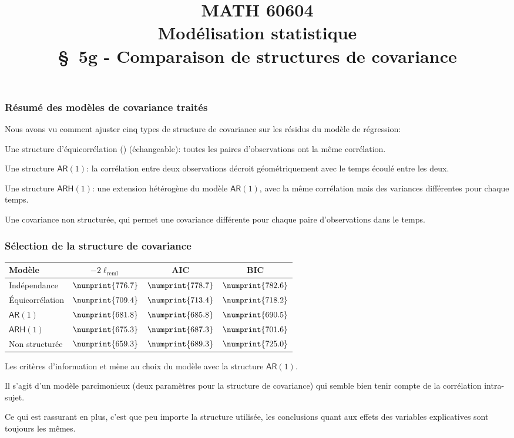 \documentclass{beamer}
\title[\color{white}{MATH 60604 \S~5g - Comparaison de structures de covariance}]{\texorpdfstring{MATH 60604 \\Modélisation statistique \\ \S~5g - Comparaison de structures de covariance}{MATH 60604 \\Modélisation statistique \\ \S~5g - Comparaison de structures de covariance}}
\author{}
\institute{HEC Montréal\\
Département de sciences de la décision}
\date{}
\begin{document}
\frame{\titlepage}

\begin{frame}[fragile]
\frametitle{Résumé des modèles de covariance traités}
\bi
\item Nous avons vu comment ajuster cinq types de structure de covariance sur les résidus du modèle de régression:
\bi

\item Une structure d'équicorrélation () (échangeable): toutes les paires d'observations ont la même corrélation.
\item Une structure \alert{$\mathsf{AR}(1)$}: la corrélation entre deux observations décroit géométriquement avec le temps écoulé entre les deux. 
\item Une structure \alert{$\mathsf{ARH}(1)$}: une extension hétérogène du modèle $\mathsf{AR}(1)$, avec la même corrélation mais des variances différentes pour chaque temps.
\item Une covariance \alert{non structurée}, qui permet une covariance différente pour chaque paire d'observations dans le temps.
\ei
\ei
\end{frame}

\begin{frame}[fragile]
\frametitle{Sélection de la structure de covariance}
\begin{center}
\begin{footnotesize}
\begin{tabular}{l c c c}
\toprule 
\textbf{Modèle} & $-2\ell_{\textrm{reml}}$ & \textbf{AIC} & \textbf{BIC} \\ \midrule
Indépendance & $ \numprint{776.7}$ & $ \numprint{778.7}$ & $\numprint{782.6}$ \\ 
Équicorrélation & $\numprint{709.4}$ & $ \numprint{713.4}$ & $\numprint{718.2}$ \\ 
$\mathsf{AR}(1)$ & $\numprint{681.8}$ & \alert{$\numprint{685.8}$} & \alert{$ \numprint{690.5}$} \\ 
$\mathsf{ARH}(1)$ & $ \numprint{675.3}$ & $ \numprint{687.3}$ & $ \numprint{701.6}$ \\ 
Non structurée & $ \numprint{659.3}$ & $ \numprint{689.3}$ & $ \numprint{725.0}$ \\ \bottomrule
\end{tabular}
\end{footnotesize}
\end{center}
\bi
\item  Les critères d'information \AIC{} et \BIC{} mène au choix du modèle avec la structure $\mathsf{AR}(1)$. 
\item Il s'agit d'un modèle parcimonieux (deux paramètres pour la structure de covariance) qui semble bien tenir compte de la corrélation intra-sujet.
\item Ce qui est rassurant en plus, c'est que peu importe la structure utilisée, les conclusions quant aux effets des variables explicatives sont toujours les mêmes.
\ei
\end{frame}
\end{document}
